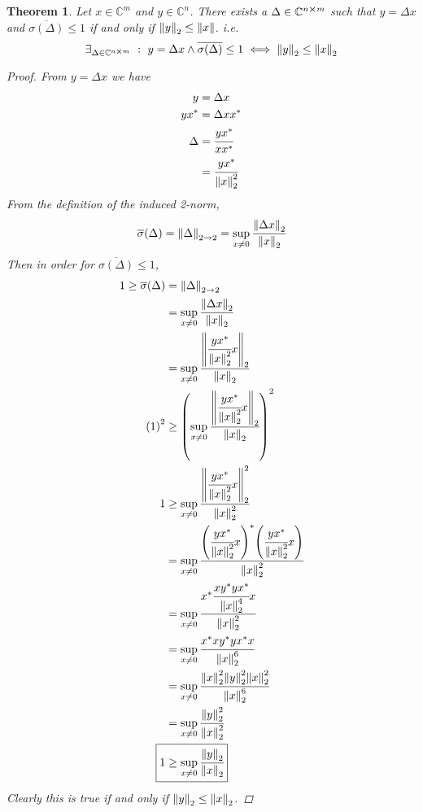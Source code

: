 \documentclass[letter]{article}
\numberwithin{equation}{section}
\newcommand{\C}{\mathbb{C}}
\newcommand{\st}{\ : \ }
\newtheorem{theorem}{Theorem}
\begin{document}
\begin{theorem}
    Let $x \in \C^m$ and $y \in \C^n$.
    There exists a $\Delta \in \C^{n\cross m}$ such that $y = \Delta x$ and $\overline{\sigma(\Delta)}\leq 1$ if and only if $\norm{y}_2 \leq \norm{x}$.
    i.e.\[
        \exists_{\Delta \in \C^{n\cross m}} \st y = \Delta x \land \overline{\sigma(\Delta)}\leq 1
        \iff \norm{y}_2 \leq \norm{x}_2
    \]
    \begin{proof}
        From $y = \Delta x$ we have \begin{align*}
            y &= \Delta x\\
            y x^* &= \Delta x x^*\\
            \Delta 
                &= \cfrac{y x^*}{x x^*}\\
                &= \cfrac{y x^*}{\norm{x}_2^2}
        \end{align*}
        From the definition of the induced 2-norm,\[
            \overline{\sigma}(\Delta) = \norm{\Delta}_{2\to2} 
                = \sup_{x \neq 0} \cfrac{\norm{\Delta x}_2}{\norm{x}_2}
        \] Then in order for $\overline{\sigma(\Delta)}\leq 1$, \begin{align*}
            1 \geq \overline{\sigma}(\Delta) 
                &= \norm{\Delta}_{2\to2}\\
                &= \sup_{x \neq 0} \cfrac{\norm{\Delta x}_2}{\norm{x}_2}\\
                &= \sup_{x \neq 0} \cfrac{\norm{\cfrac{y x^*}{\norm{x}_2^2} x}_2}{\norm{x}_2}\\
            \qty(1)^2
                &\geq \qty(\sup_{x \neq 0} \cfrac{\norm{\cfrac{y x^*}{\norm{x}_2^2} x}_2}{\norm{x}_2})^2\\
            1   
                &\geq \sup_{x \neq 0} \cfrac{\norm{\cfrac{y x^*}{\norm{x}_2^2}x}_2^2}{\norm{x}_2^2}\\
                &= \sup_{x \neq 0} \cfrac{
                    \qty(\cfrac{y x^*}{\norm{x}_2^2}x)^* \qty(\cfrac{y x^*}{\norm{x}_2^2}x)
                    }{\norm{x}_2^2}\\
                &= \sup_{x \neq 0} \cfrac{x^* \cfrac{x y^* y x^*}{\norm{x}_2^4} x
                    }{\norm{x}_2^2}\\
                &= \sup_{x \neq 0} \cfrac{x^* x y^* y x^* x}{\norm{x}_2^6}\\
                &= \sup_{x \neq 0} \cfrac{\norm{x}_2^2 \norm{y}_2^2 \norm{x}_2^2}{\norm{x}_2^6}\\
                &= \sup_{x \neq 0} \cfrac{\norm{y}_2^2}{\norm{x}_2^2}\\
            \Aboxed{
                1 &\geq \sup_{x \neq 0} \cfrac{\norm{y}_2}{\norm{x}_2}
            }
        \end{align*}
        Clearly this is true if and only if $\norm{y}_2 \leq \norm{x}_2$.
    \end{proof}
\end{theorem}
\end{document}
